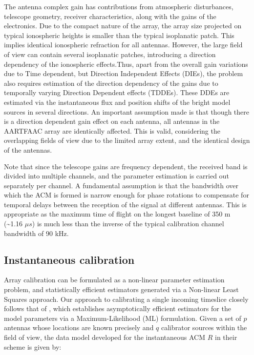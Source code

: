\documentclass{aa}
\begin{document}
The antenna complex gain has contributions from atmospheric disturbances,
telescope geometry, receiver characteristics, along with the gains
of the electronics. Due to the compact nature of the array, the array
size projected on typical ionospheric heights is smaller than the
typical isoplanatic patch. This implies identical ionospheric refraction
for all antennas. However, the large field of view can contain several
isoplanatic patches, introducing a direction dependency of the ionospheric
effects.Thus, apart from the overall gain variations due to Time dependent,
but Direction Independent Effects (DIEs), the problem also requires
estimation of the direction dependency of the gains due to temporally
varying Direction Dependent effects (TDDEs). These DDEs are estimated
via the instantaneous flux and position shifts of the bright model
sources in several directions. An important assumption made is that
though there is a direction dependent gain effect on each antenna,
all antennas in the AARTFAAC array are identically affected. This
is valid, considering the overlapping fields of view due to the limited
array extent, and the identical design of the antennas.

Note that since the telescope gains are frequency dependent, the received
band is divided into multiple channels, and the parameter estimation
is carried out separately per channel. A fundamental assumption is
that the bandwidth over which the ACM is formed is narrow enough for
phase rotations to compensate for temporal delays between the reception
of the signal at different antennas\citep{zatman1998narrow}. This
is appropriate as the maximum time of flight on the longest baseline
of 350 m (\textasciitilde{}1.16 $\mu s$) is much less than the inverse
of the typical calibration channel bandwidth of $90$ kHz. 


\subsection{Instantaneous calibration}

Array calibration can be formulated as a non-linear parameter estimation
problem, and statistically efficient estimators generated via a Non-linear
Least Squares approach. Our approach to calibrating a single incoming
timeslice closely follows that of \citep{wijnholds2009multisource},
which establishes asymptotically efficient estimators for the model
parameters via a Maximum-Likelihood (ML) formulation. Given a set
of $p$ antennas whose locations are known precisely and $q$ calibrator
sources within the field of view, the data model developed for the
instantaneous ACM $R$ in their scheme is given by:
\end{document}
